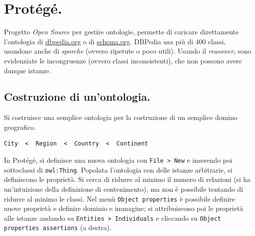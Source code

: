\documentclass[11pt]{article}
\begin{document}
\section{Protégé.}
Progetto \textit{Open Source} per gestire ontologie, permette di caricare direttamente l'ontologia di \url{dbpedia.org} o di \url{schema.org}.
DBPedia usa più di $400$ classi, usandone anche di \textit{sporche} (ovvero ripetute o poco utili).
Usando il \textit{reasoner}, sono evidenziate le incongruenze (ovvero classi inconsistenti), che non possono avere dunque istanze.

\subsection*{Costruzione di un'ontologia.}
Si costruisce una semplice ontologia per la costruzione di un semplice domino geografico.
\begin{verbatim}
City  <  Region  <  Country  <  Continent
\end{verbatim}
In Protégé, si definisce una nuova ontologia con \verb|File > New| e inserendo poi sottoclassi di \verb|owl:Thing|.
Popolata l'ontologia con delle istanze arbitrarie, si definiscono le proprietà.
Si cerca di ridurre al minimo il numero di relazioni (si ha un'intuizione della definizione di contenimento), ma non è possibile tentando di ridurre al minimo le classi.
Nel menù \verb|Object properties| è possibile definire nuove proprietà e definire dominio e immagine; si attribuiscono poi le proprietà alle istanze andando su \verb|Entities > Individuals| e cliccando su \verb|Object properties assertions| (a destra).
\end{document}
